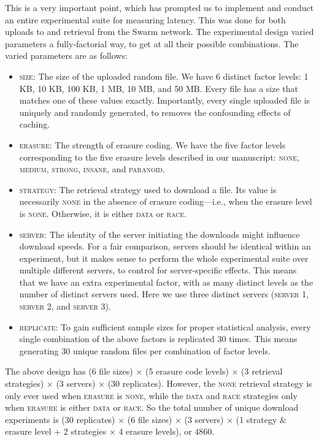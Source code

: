 \documentclass[11pt]{article}
\newcommand{\us}{\rm \setlength{\leftskip}{0.3cm} \setlength{\rightskip}{0.3cm}}
\begin{document}
\us

This is a very important point, which has prompted us to implement and conduct an entire experimental suite for measuring latency. This was done for both uploads to and retrieval from the Swarm network. The experimental design varied parameters a fully-factorial way, to get at all their possible combinations. The varied parameters are as follows:

\begin{itemize}
\item \textsc{size}: The size of the uploaded random file. We have 6 distinct factor levels: 1 KB, 10 KB, 100 KB, 1 MB, 10 MB, and 50 MB. Every file has a size that matches one of these values exactly. Importantly, every single uploaded file is uniquely and randomly generated, to removes the confounding effects of caching.
\item \textsc{erasure}: The strength of erasure coding. We have the five factor levels corresponding to the five erasure levels described in our manuscript: \textsc{none}, \textsc{medium}, \textsc{strong}, \textsc{insane}, and \textsc{paranoid}.
\item \textsc{strategy}: The retrieval strategy used to download a file. Its value is necessarily \textsc{none} in the absence of erasure coding---i.e., when the erasure level is \textsc{none}. Otherwise, it is either \textsc{data} or \textsc{race}.
\item \textsc{server}: The identity of the server initiating the downloads might influence download speeds. For a fair comparison, servers should be identical within an experiment, but it makes sense to perform the whole experimental suite over multiple different servers, to control for server-specific effects. This means that we have an extra experimental factor, with as many distinct levels as the number of distinct servers used. Here we use three distinct servers (\textsc{server 1}, \textsc{server 2}, and \textsc{server 3}).
\item \textsc{replicate}: To gain sufficient sample sizes for proper statistical analysis, every single combination of the above factors is replicated 30 times. This means generating 30 unique random files per combination of factor levels.
\end{itemize}

The above design has (6 file sizes) $\times$ (5 erasure code levels) $\times$ (3 retrieval strategies) $\times$ (3 servers) $\times$ (30 replicates). However, the \textsc{none} retrieval strategy is only ever used when \textsc{erasure} is \textsc{none}, while the \textsc{data} and \textsc{race} strategies only when \textsc{erasure} is either \textsc{data} or \textsc{race}. So the total number of unique download experiments is (30 replicates) $\times$ (6 file sizes) $\times$ (3 servers) $\times$ (1 strategy \& erasure level + 2 strategies $\times$ 4 erasure levels), or $4860$.
\end{document}
